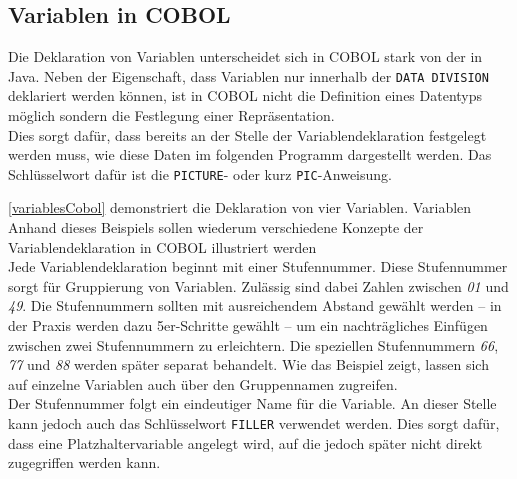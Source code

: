 \subsection*{Variablen in COBOL}
Die Deklaration von Variablen unterscheidet sich in COBOL stark von der in Java. Neben der Eigenschaft, dass Variablen nur innerhalb der \texttt{DATA DIVISION} deklariert werden können, ist in COBOL nicht die Definition eines Datentyps möglich sondern die Festlegung einer Repräsentation. \\

Dies sorgt dafür, dass bereits an der Stelle der Variablendeklaration festgelegt werden muss, wie diese Daten im folgenden Programm dargestellt werden. Das Schlüsselwort dafür ist die \texttt{PICTURE}- oder kurz \texttt{PIC}-Anweisung.\\

\sepCodeAndOutputCheck
{}

\autoref{variablesCobol} demonstriert die Deklaration von vier Variablen. Variablen Anhand dieses Beispiels sollen wiederum verschiedene Konzepte der Variablendeklaration in COBOL illustriert werden\\

Jede Variablendeklaration beginnt mit einer Stufennummer. Diese Stufennummer sorgt für Gruppierung von Variablen. Zulässig sind dabei Zahlen zwischen \textit{01} und \textit{49}. Die Stufennummern sollten mit ausreichendem Abstand gewählt werden -- in der Praxis werden dazu 5er-Schritte gewählt --  um ein nachträgliches Einfügen zwischen zwei Stufennummern zu erleichtern. Die speziellen Stufennummern \textit{66}, \textit{77} und \textit{88} werden später separat behandelt. Wie das Beispiel zeigt, lassen sich auf einzelne Variablen auch über den Gruppennamen zugreifen. \\

Der Stufennummer folgt ein eindeutiger Name für die Variable. An dieser Stelle kann jedoch auch das Schlüsselwort \texttt{FILLER} verwendet werden. Dies sorgt dafür, dass eine Platzhaltervariable angelegt wird, auf die jedoch später nicht direkt zugegriffen werden kann.\\

